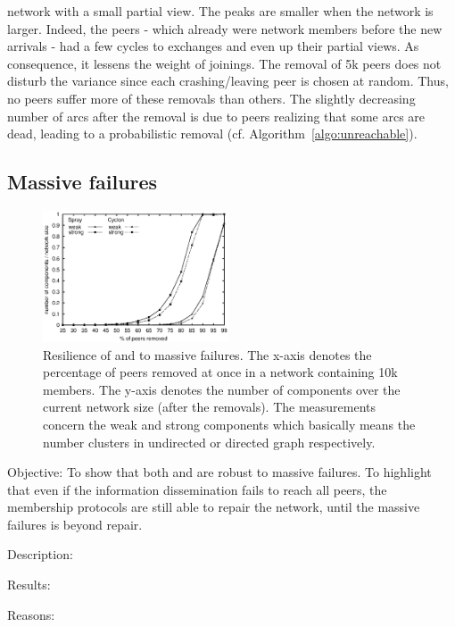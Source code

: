 \begin{asparadesc}
  network with a small partial view. The peaks are smaller when the network is
  larger. Indeed, the peers - which already were network members before the new
  arrivals - had a few cycles to exchanges and even up their partial views. As
  consequence, it lessens the weight of joinings. The removal of 5k peers does
  not disturb the variance since each crashing/leaving peer is chosen at
  random. Thus, no peers suffer more of these removals than others. The
  slightly decreasing number of arcs after the removal is due to peers
  realizing that some arcs are dead, leading to a probabilistic removal
  (cf. Algorithm~\ref{algo:unreachable}).
\end{asparadesc}

\subsection{Massive failures}
\label{subsec:resilience}

\begin{figure}
  \centering
  \includegraphics[width=0.49\textwidth]{img/resilience.eps}
  \caption{\label{fig:resilience}Resilience of \CYCLON and \SPRAY to massive
    failures. The x-axis denotes the percentage of peers removed at once in a
    network containing 10k members. The y-axis denotes the number of
    components over the current network size (after the removals). The
    measurements concern the weak and strong components which basically means
    the number clusters in undirected or directed graph respectively.}
\end{figure}

% 

\begin{asparadesc}
\item[Objective:] To show that both \SPRAY and \CYCLON are robust to massive
   failures. To highlight that even if the information
  dissemination fails to reach all peers, the membership protocols are still
  able to repair the network, until the massive failures is beyond repair.
\item[Description:] 
\item[Results:]
\item[Reasons:]
\end{asparadesc}

